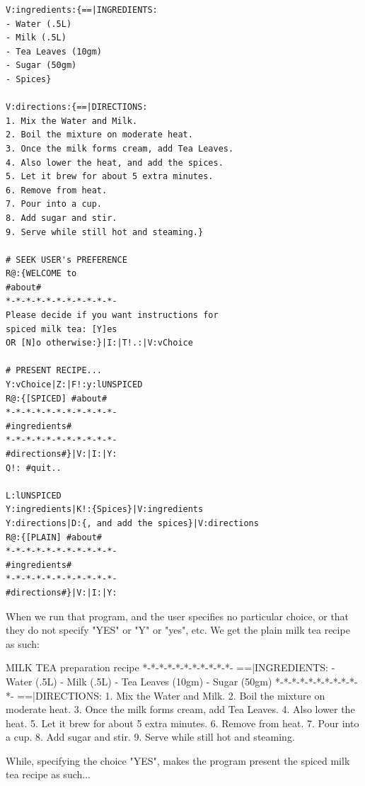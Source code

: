\documentclass[a4paper, 18pt]{book} %
\begin{document}
{{{\begin{appendices}
\begin{tcolorbox}[teaterminalstyle, title=Conditional Branching in TEA: MILK TEA RECIPE Presenter, breakable]
\begin{lstlisting}[language=TEA,breaklines=true,]
V:ingredients:{==|INGREDIENTS:
- Water (.5L)
- Milk (.5L)
- Tea Leaves (10gm)
- Sugar (50gm)
- Spices}

V:directions:{==|DIRECTIONS:
1. Mix the Water and Milk.
2. Boil the mixture on moderate heat.
3. Once the milk forms cream, add Tea Leaves.
4. Also lower the heat, and add the spices.
5. Let it brew for about 5 extra minutes.
6. Remove from heat.
7. Pour into a cup.
8. Add sugar and stir.
9. Serve while still hot and steaming.}

# SEEK USER's PREFERENCE
R@:{WELCOME to
#about#
*-*-*-*-*-*-*-*-*-*-*-
Please decide if you want instructions for 
spiced milk tea: [Y]es
OR [N]o otherwise:}|I:|T!.:|V:vChoice

# PRESENT RECIPE...
Y:vChoice|Z:|F!:y:lUNSPICED
R@:{[SPICED] #about#
*-*-*-*-*-*-*-*-*-*-*-
#ingredients#
*-*-*-*-*-*-*-*-*-*-*-
#directions#}|V:|I:|Y:
Q!: #quit..

L:lUNSPICED
Y:ingredients|K!:{Spices}|V:ingredients
Y:directions|D:{, and add the spices}|V:directions
R@:{[PLAIN] #about#
*-*-*-*-*-*-*-*-*-*-*-
#ingredients#
*-*-*-*-*-*-*-*-*-*-*-
#directions#}|V:|I:|Y:
   \end{lstlisting}
  \end{tcolorbox}

\vspace{2em}


When we run that program, and the user specifies no particular choice, or that they do not specify "YES" or "Y" or "yes", etc. We get the plain milk tea recipe as such:

\vspace{2em}

  
 \begin{tcbverbatim}[title=Plain Milk TEA Recipe]
[PLAIN] MILK TEA preparation recipe
*-*-*-*-*-*-*-*-*-*-*-
==|INGREDIENTS:
- Water (.5L)
- Milk (.5L)
- Tea Leaves (10gm)
- Sugar (50gm)
*-*-*-*-*-*-*-*-*-*-*-
==|DIRECTIONS:
1. Mix the Water and Milk.
2. Boil the mixture on moderate heat.
3. Once the milk forms cream, add Tea Leaves.
4. Also lower the heat.
5. Let it brew for about 5 extra minutes.
6. Remove from heat.
7. Pour into a cup.
8. Add sugar and stir.
9. Serve while still hot and steaming.
  \end{tcbverbatim}
  
  \vspace{2em}
  
  While, specifying the choice "YES", makes the program present the spiced milk tea recipe as such...
  
  \vspace{2em}
    

\end{appendices}}}}
\end{document}
